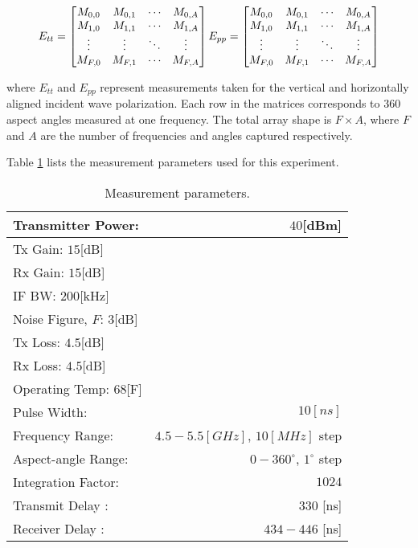   \begin{equation}\label{eq:RCS_mat}
    E_{tt} =
     \begin{bmatrix}
       M_{0,0} & M_{0,1} & \cdots & M_{0,A} \\
       M_{1,0} & M_{1,1} & \cdots & M_{1,A} \\
       \vdots  & \vdots  & \ddots & \vdots  \\
       M_{F,0} & M_{F,1} & \cdots & M_{F,A}
     \end{bmatrix}
     \\
     E_{pp} =
      \begin{bmatrix}
      M_{0,0} & M_{0,1} & \cdots & M_{0,A} \\
      M_{1,0} & M_{1,1} & \cdots & M_{1,A} \\
      \vdots  & \vdots  & \ddots & \vdots  \\
      M_{F,0} & M_{F,1} & \cdots & M_{F,A}
      \end{bmatrix}
  \end{equation}

  where $E_{tt}$ and $E_{pp}$ represent measurements taken for the vertical and horizontally aligned incident wave polarization. Each row in the matrices corresponds to 360 aspect angles measured at one frequency. The total array shape is $F \times A$, where $F$ and $A$ are the number of frequencies and angles captured respectively.

  Table \ref{tab:m_params} lists the measurement parameters used for this experiment.

  \begin{table}
    \centering
    \begin{tabular}{|l|r|}
      \hline
      Transmitter Power: & $40$[dBm]\\
      \hline
      Tx Gain: $15$[dB]\\
      \hline
      Rx Gain: $15$[dB]\\
      \hline
      IF BW: $200$[kHz]\\
      \hline
      Noise Figure, $F$:  $3$[dB]\\
      \hline
      Tx Loss: $4.5$[dB]\\
      \hline
      Rx Loss: $4.5$[dB]\\
      \hline
      Operating Temp: $68$[F]\\
      \hline
      Pulse Width: & $10[ns]$\\
      \hline
      Frequency Range: & $4.5-5.5 [GHz]$, $10 [MHz]$ step\\
      \hline
      Aspect-angle Range: & $0-360 ^{\circ}$, $1^{\circ}$ step\\
      \hline
      Integration Factor: & $1024$ \\
      \hline
      Transmit Delay : & $330$ [ns] \\
      \hline
      Receiver Delay : & $434-446$ [ns] \\
      \hline
    \end{tabular}
    \caption{Measurement parameters.}
    \label{tab:m_params}
  \end{table}

